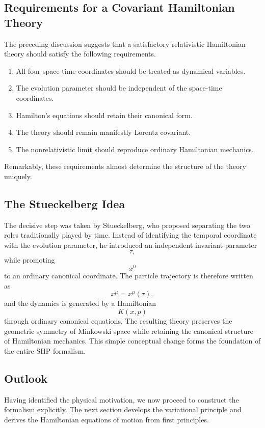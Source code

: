 \subsection{Requirements for a Covariant Hamiltonian Theory}
The preceding discussion suggests that a satisfactory relativistic
Hamiltonian theory should satisfy the following requirements.
\begin{enumerate}
\item
All four space-time coordinates should be treated as dynamical
variables.
\item
The evolution parameter should be independent of the space-time
coordinates.
\item
Hamilton's equations should retain their canonical form.
\item
The theory should remain manifestly Lorentz covariant.
\item
The nonrelativistic limit should reproduce ordinary Hamiltonian
mechanics.
\end{enumerate}
Remarkably, these requirements almost determine the structure of the
theory uniquely.
\subsection{The Stueckelberg Idea}
The decisive step was taken by Stueckelberg, who proposed separating the
two roles traditionally played by time.
Instead of identifying the temporal coordinate with the evolution
parameter, he introduced an independent invariant parameter
\[\tau,\]
while promoting
\[x^0\]
to an ordinary canonical coordinate.
The particle trajectory is therefore written as
\[x^\mu=x^\mu(\tau),\]
and the dynamics is generated by a Hamiltonian
\[K(x,p)\]
through ordinary canonical equations.
The resulting theory preserves the geometric symmetry of Minkowski
space while retaining the canonical structure of Hamiltonian mechanics.
This simple conceptual change forms the foundation of the entire SHP
formalism.
\subsection{Outlook}
Having identified the physical motivation, we now proceed to construct
the formalism explicitly.
The next section develops the variational principle and derives the
Hamiltonian equations of motion from first principles.
